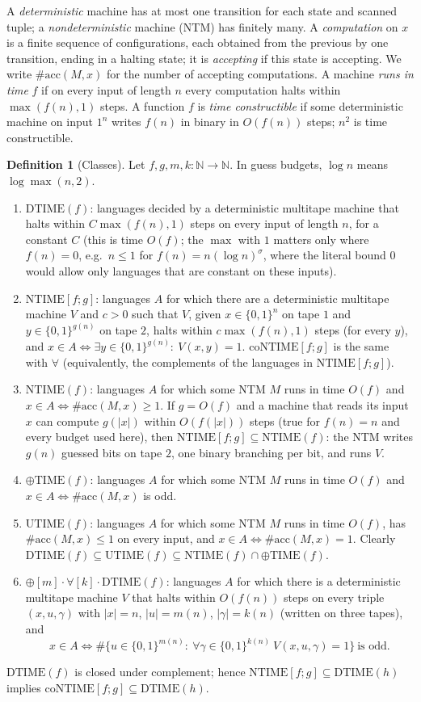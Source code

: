 \documentclass[11pt]{article}
\theoremstyle{definition}
\newtheorem{definition}[theorem]{Definition}
\theoremstyle{remark}
\newcommand{\DTIME}{\mathrm{DTIME}}
\newcommand{\NTIME}{\mathrm{NTIME}}
\newcommand{\coNTIME}{\mathrm{coNTIME}}
\newcommand{\parTIME}{\oplus\mathrm{TIME}}
\newcommand{\acc}{\#\mathrm{acc}}
\begin{document}
A \emph{deterministic} machine has at most one transition for each state and scanned tuple; a \emph{nondeterministic} machine
(NTM) has finitely many. A \emph{computation} on $x$ is a finite sequence of configurations, each obtained from the previous by
one transition, ending in a halting state; it is \emph{accepting} if this state is accepting. We write $\acc(M,x)$ for the
number of accepting computations. A machine \emph{runs in time} $f$ if on every input of length $n$ every computation halts
within $\max(f(n),1)$ steps. A function $f$ is \emph{time constructible} if some deterministic machine on input $1^n$ writes $f(n)$ in
binary in $O(f(n))$ steps; $n^2$ is time constructible.

\begin{definition}[Classes]\label{def:classes}
Let $f,g,m,k:\mathbb N\to\mathbb N$. In guess budgets, $\log n$ means $\log\max(n,2)$.
\begin{enumerate}
\item $\DTIME(f)$: languages decided by a deterministic multitape machine that halts within $C\max(f(n),1)$ steps on every input of length $n$, for a constant $C$ (this is time $O(f)$; the $\max$ with $1$ matters only where $f(n)=0$, e.g.\ $n\le1$ for $f(n)=n(\log n)^\sigma$, where the literal bound $0$ would allow only languages that are constant on these inputs).
\item $\NTIME[f;g]$: languages $A$ for which there are a deterministic multitape machine $V$ and $c>0$ such that $V$, given
  $x\in\{0,1\}^n$ on tape $1$ and $y\in\{0,1\}^{g(n)}$ on tape $2$, halts within $c\max(f(n),1)$ steps (for every $y$), and
  $x\in A\iff\exists y\in\{0,1\}^{g(n)}:\ V(x,y)=1$. $\coNTIME[f;g]$ is the same with $\forall$ (equivalently, the
  complements of the languages in $\NTIME[f;g]$).
\item $\NTIME(f)$: languages $A$ for which some NTM $M$ runs in time $O(f)$ and $x\in A\iff\acc(M,x)\ge1$. If $g=O(f)$ and a machine that reads its
  input $x$ can compute $g(|x|)$ within $O(f(|x|))$ steps (true for $f(n)=n$ and every budget used here), then $\NTIME[f;g]\subseteq\NTIME(f)$: the NTM
  writes $g(n)$ guessed bits on tape $2$, one binary branching per bit, and runs $V$.
\item $\parTIME(f)$: languages $A$ for which some NTM $M$ runs in time $O(f)$ and $x\in A\iff\acc(M,x)$ is odd.
\item $\mathrm{UTIME}(f)$: languages $A$ for which some NTM $M$ runs in time $O(f)$, has $\acc(M,x)\le1$ on every input, and
  $x\in A\iff\acc(M,x)=1$. Clearly $\DTIME(f)\subseteq\mathrm{UTIME}(f)\subseteq\NTIME(f)\cap\parTIME(f)$.
\item $\oplus[m]\cdot\forall[k]\cdot\DTIME(f)$: languages $A$ for which there is a deterministic multitape machine $V$ that halts
  within $O(f(n))$ steps on every triple $(x,u,\gamma)$ with $|x|=n$, $|u|=m(n)$, $|\gamma|=k(n)$ (written on three tapes), and
  \[
     x\in A\iff \#\{u\in\{0,1\}^{m(n)}:\ \forall\gamma\in\{0,1\}^{k(n)}\ V(x,u,\gamma)=1\}\ \text{is odd}.
  \]
\end{enumerate}
\end{definition}
$\DTIME(f)$ is closed under complement; hence $\NTIME[f;g]\subseteq\DTIME(h)$ implies $\coNTIME[f;g]\subseteq\DTIME(h)$.
\end{document}
